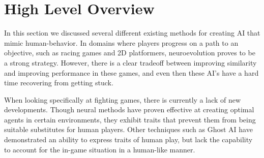\section{High Level Overview}
In this section we discussed several different existing methods for creating AI that mimic human-behavior. In domains where players progress on a path to an objective, such as racing games and 2D platformers, neuroevolution proves to be a strong strategy. However, there is a clear tradeoff between improving similarity and improving performance in these games, and even then these AI's have a hard time recovering from getting stuck. 

When looking specifically at fighting games, there is currently a lack of new developments. Though neural methods have proven effective at creating optimal agents in certain environments, they exhibit traits that prevent them from being suitable substitutes for human players. Other techniques such as Ghost AI have demonstrated an ability to express traits of human play, but lack the capability to account for the in-game situation in a human-like manner.

